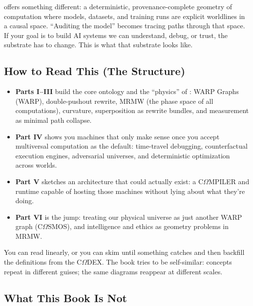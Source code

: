\COMPUTER{} offers something different: a deterministic, provenance-complete geometry of computation where models, datasets, and training runs are explicit worldlines in a causal space. ``Auditing the model'' becomes tracing paths through that space. If your goal is to build AI systems we can understand, debug, or trust, the substrate has to change. This is what that substrate looks like.

\subsection*{How to Read This (The Structure)}

\begin{itemize}
  \item \textbf{Parts I--III} build the core ontology and the ``physics'' of \COMPUTER{}: WARP Graphs (WARP), double-pushout rewrite, MRMW (the phase space of all computations), curvature, superposition as rewrite bundles, and measurement as minimal path collapse.
  \item \textbf{Part IV} shows you machines that only make sense once you accept multiversal computation as the default: time-travel debugging, counterfactual execution engines, adversarial universes, and deterministic optimization across worlds.
  \item \textbf{Part V} sketches an architecture that could actually exist: a C$\Omega$MPILER and runtime capable of hosting those machines without lying about what they're doing.
  \item \textbf{Part VI} is the jump: treating our physical universe as just another WARP graph (C$\Omega$SMOS), and intelligence and ethics as geometry problems in MRMW.
\end{itemize}

\noindent
You can read linearly, or you can skim until something catches and then backfill the definitions from the C$\Omega$DEX. The book tries to be self-similar: concepts repeat in different guises; the same diagrams reappear at different scales.

\subsection*{What This Book Is Not}

